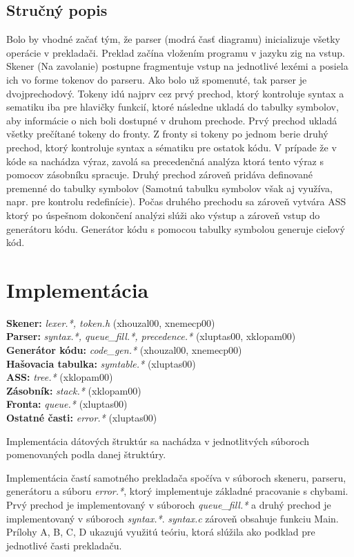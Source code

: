 \documentclass[Slovak, a4paper, 12pt]{article}
\begin{document}
	\subsection{Stručný popis}
	Bolo by vhodné začať tým, že parser (modrá časť diagramu) inicializuje všetky operácie v prekladači.  
	Preklad začína vložením programu v jazyku zig na
	 vstup. Skener (Na zavolanie) postupne fragmentuje vstup na jednotlivé lexémi a posiela ich vo forme tokenov do parseru.  Ako bolo už spomenuté, tak parser je dvojprechodový. Tokeny idú najprv cez prvý prechod, ktorý kontroluje syntax a sematiku iba pre hlavičky funkcií, ktoré následne ukladá do tabulky symbolov, aby informácie o nich boli dostupné v druhom prechode. Prvý prechod ukladá všetky prečítané tokeny do fronty. Z fronty si tokeny po jednom berie druhý prechod, ktorý kontroluje syntax a sématiku pre ostatok kódu. V prípade že v kóde sa nachádza výraz, zavolá sa precedenčná analýza ktorá tento výraz s pomocov zásobníku spracuje. Druhý prechod zároveň pridáva definované premenné do tabulky symbolov  (Samotnú tabulku symbolov však aj využíva, napr. pre kontrolu redefinície).  Počas druhého prechodu sa zároveň vytvára ASS ktorý po úspešnom dokončení analýzi slúži ako výstup a zároveň vstup do generátoru kódu. Generátor kódu s pomocou tabulky symbolou generuje cieľový kód.
	 	
	\newpage
	\section{Implementácia}
	\textbf{Skener: }\textit{lexer.*, token.h} (xhouzal00, xnemecp00)\\ 
	\textbf{Parser: }\textit{syntax.*, queue\_fill.*, precedence.*} (xluptas00, xklopam00)\\
	\textbf{Generátor kódu: }\textit{code\_gen.*} (xhouzal00, xnemecp00)\\
	\textbf{Hašovacia tabulka: }\textit{symtable.*} (xluptas00)\\
	\textbf{ASS: }\textit{tree.*} (xklopam00)\\
	\textbf{Zásobník: }\textit{stack.*} (xklopam00)\\
	\textbf{Fronta: }\textit{queue.*} (xluptas00)\\
	\textbf{Ostatné časti: }\textit{error.*} (xluptas00)\\
	\par Implementácia dátových štruktúr sa nachádza v jednotlitvých súboroch pomenovaných podla danej štruktúry.
	\par Implementácia častí samotného prekladača spočíva v súboroch skeneru, parseru, generátoru a súboru \textit{error.*}, ktorý 
	implementuje základné pracovanie s chybami. Prvý prechod je implementovaný v súboroch \textit{queue\_fill.*} a druhý prechod je
	implementovaný v súboroch \textit{syntax.*}. \textit{syntax.c} zároveň obsahuje funkciu Main. Prílohy A, B, C, D ukazujú využitú teóriu, ktorá slúžila ako podklad pre jednotlivé časti prekladaču.
\end{document}
